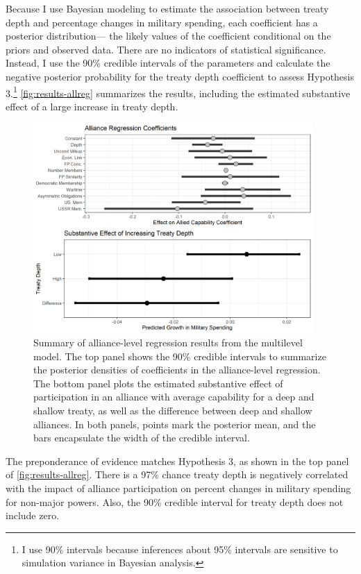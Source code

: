 \documentclass[12pt]{article}
\begin{document}
Because I use Bayesian modeling to estimate the association between treaty depth and percentage changes in military spending, each coefficient has a posterior distribution--- the likely values of the coefficient conditional on the priors and observed data.
There are no indicators of statistical significance. 
Instead, I use the 90\% credible intervals of the parameters and calculate the negative posterior probability for the treaty depth coefficient to assess Hypothesis 3.\footnote{I use 90\% intervals because inferences about 95\% intervals are sensitive to simulation variance in Bayesian analysis.}
\autoref{fig:results-allreg} summarizes the results, including the estimated substantive effect of a large increase in treaty depth. 


\begin{figure}[htbp]
	\centering
		\includegraphics[width=0.95\textwidth]{../figures/results-allreg.png}
	\caption{Summary of alliance-level regression results from the multilevel model. The top panel shows the 90\% credible intervals to summarize the posterior densities of coefficients in the alliance-level regression. The bottom panel plots the estimated substantive effect of participation in an alliance with average capability for a deep and shallow treaty, as well as the difference between deep and shallow alliances. In both panels, points mark the posterior mean, and the bars encapsulate the width of the credible interval. }
	\label{fig:results-allreg}
\end{figure}


The preponderance of evidence matches Hypothesis 3, as shown in the top panel of \autoref{fig:results-allreg}.
There is a 97\% chance treaty depth is negatively correlated with the impact of alliance participation on percent changes in military spending for non-major powers.
Also, the 90\% credible interval for treaty depth does not include zero. 
\end{document}
